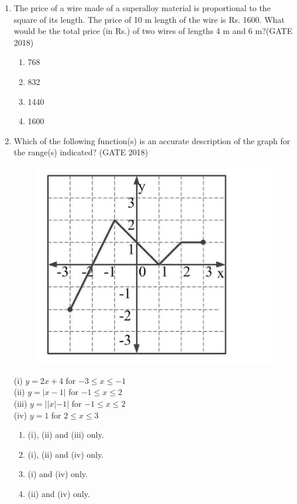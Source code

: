 \documentclass[journal,12pt,onecolumn]{IEEEtran}
\theoremstyle{remark}
\begin{document}
\begin{enumerate}
\item The price of a wire made of a superalloy material is proportional to the square of its length. The price of 10 m length of the wire is Rs. 1600. What would be the total price (in Rs.) of two wires of lengths 4 m and 6 m?\hfill{(GATE 2018)}
\begin{multicols}{4}
\begin{enumerate}
    \item 768
    \item 832
    \item 1440
    \item 1600
\end{enumerate}
\end{multicols}
\vspace{1cm}

\item Which of the following function(s) is an accurate description of the graph for the range(s) indicated?
\hfill{(GATE 2018)}
\begin{figure}[h]
    \centering
    \includegraphics[width=0.5\linewidth]{GATE-CE-2018/8A-1.png}
    \caption{}
    \label{8a-1}
\end{figure}
(i) $y = 2x + 4$ for $-3 \leq x \leq -1$ \\
(ii) $y = |x-1|$ for $-1 \leq x \leq 2$ \\
(iii) $y = ||x|-1|$ for $-1 \leq x \leq 2$ \\
(iv) $y = 1$ for $2 \leq x \leq 3$ 
\begin{multicols}{4}
\begin{enumerate}
    \item (i), (ii) and (iii) only.
    \item (i), (ii) and (iv) only.
    \item (i) and (iv) only.
    \item (ii) and (iv) only.
\end{enumerate}
\end{multicols}

\end{enumerate}
\end{document}
